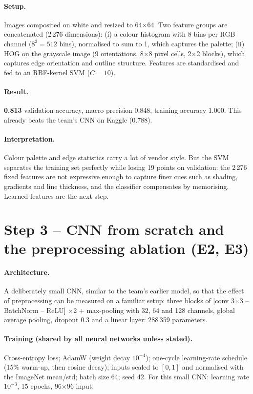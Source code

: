 \documentclass[11pt,a4paper]{article}
\begin{document}
\paragraph{Setup.} Images composited on white and resized to 64$\times$64. Two feature groups are
concatenated (2\,276 dimensions): (i) a colour histogram with 8 bins per RGB channel
($8^3=512$ bins), normalised to sum to 1, which captures the palette; (ii) HOG on the grayscale
image (9 orientations, 8$\times$8 pixel cells, 2$\times$2 blocks), which captures edge orientation and
outline structure. Features are standardised and fed to an RBF-kernel SVM ($C=10$).

\paragraph{Result.} \textbf{0.813} validation accuracy, macro precision 0.848, training accuracy
1.000. This already beats the team's CNN on Kaggle (0.788).

\paragraph{Interpretation.} Colour palette and edge statistics carry a lot of vendor style. But the
SVM separates the training set perfectly while losing 19 points on validation: the 2\,276
fixed features are not expressive enough to capture finer cues such as shading, gradients and line
thickness, and the classifier compensates by memorising. Learned features are the next step.

\section{Step 3 -- CNN from scratch and the preprocessing ablation (E2, E3)}

\paragraph{Architecture.} A deliberately small CNN, similar to the team's earlier model, so that the
effect of preprocessing can be measured on a familiar setup: three blocks of
[conv 3$\times$3 -- BatchNorm -- ReLU] $\times$2 + max-pooling with 32, 64 and 128 channels, global
average pooling, dropout 0.3 and a linear layer: 288\,359 parameters.

\paragraph{Training (shared by all neural networks unless stated).} Cross-entropy loss; AdamW
(weight decay $10^{-4}$); one-cycle learning-rate schedule (15\% warm-up, then cosine decay);
inputs scaled to $[0,1]$ and normalised with the ImageNet mean/std; batch size 64; seed 42. For this
small CNN: learning rate $10^{-3}$, 15 epochs, 96$\times$96 input.
\end{document}

